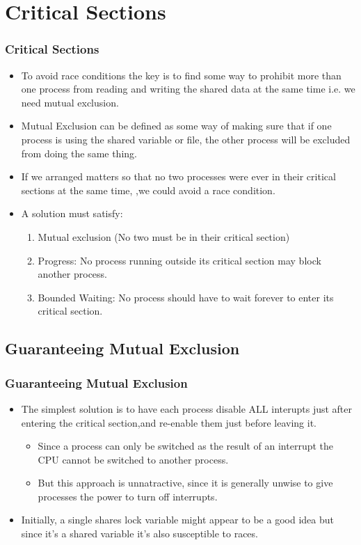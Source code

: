 \documentclass{beamer}
\begin{document}
\section{Critical Sections}
\begin{frame}
\frametitle{Critical Sections}
\begin{itemize}
\item To avoid race conditions the key is to find some way to prohibit more than one process from reading and writing the shared data at the same time i.e. we need mutual exclusion.
\item Mutual Exclusion can be defined as some way of making sure that if one process is using the shared variable or file, the other process will be excluded from doing the same thing.
\item If we arranged matters so that no two processes were ever in their critical sections at the same time, ,we could avoid a race condition.
\item A solution must satisfy:
\begin{enumerate}
\item Mutual exclusion (No two must be in their critical section)
\item Progress: No process running outside its critical section may block another process.
\item Bounded Waiting: No process should have to wait forever to enter its critical section.
\end{enumerate}
\end{itemize}
\end{frame}
\subsection{Guaranteeing Mutual Exclusion}
\begin{frame}
\frametitle{Guaranteeing Mutual Exclusion}
\begin{itemize}
\item The simplest solution is to have each process disable ALL interupts just after entering the critical section,and re-enable them just before leaving it.
\begin{itemize}
\item Since a process can only be switched as the result of an interrupt the CPU cannot be switched to another process.
\item But this approach is unnatractive, since it is generally unwise to give processes the power to turn off interrupts.
\end{itemize}
\item Initially, a single shares lock variable might appear to be a good idea but since it's a shared variable it's also susceptible to races.
\end{itemize}
\end{frame}
\end{document}
